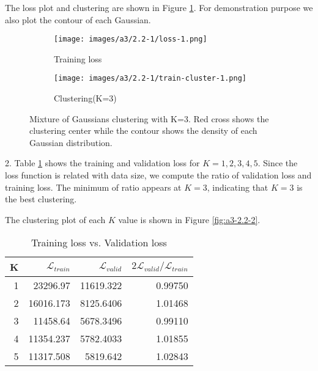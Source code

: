 \documentclass[12pt]{article}
\begin{document}
The loss plot and clustering are shown in Figure \ref{fig:a3-2.2-1}.
For demonstration purpose we also plot the contour of each Gaussian.

\begin{figure}[!htb]
\centering
\begin{subfigure}{.5\textwidth}
  \centering
  \texttt{[image: images/a3/2.2-1/loss-1.png]}
  \caption{Training loss}
\end{subfigure}%
\begin{subfigure}{.5\textwidth}
  \centering
  \texttt{[image: images/a3/2.2-1/train-cluster-1.png]}
  \caption{Clustering(K=3)}
\end{subfigure}
\caption{Mixture of Gaussians clustering with K=3. Red cross shows the clustering center while the contour shows the density of each Gaussian distribution.}
\label{fig:a3-2.2-1}
\end{figure}

\bigskip

2. Table \ref{table:a3-2.2-2} shows the training and validation loss for $K=1,2,3,4,5$. Since the loss function is related with data size, we compute the ratio of validation loss and training loss. The minimum of ratio appears at $K = 3$, indicating that $K=3$ is the best clustering.

The clustering plot of each $K$ value is shown in Figure \ref{fig:a3-2.2-2}.

\begin{table}[!htb]
\centering
\begin{tabular}{r|r|r|r}
\hline
 K & $\mathcal{L}_{train}$ & $\mathcal{L}_{valid}$ & $2 \mathcal{L}_{valid} / \mathcal{L}_{train}$ \\ \hline
1 & 23296.97 & 11619.322 & 0.99750 \\
2 & 16016.173 & 8125.6406 & 1.01468 \\
3 & 11458.64 & 5678.3496 & 0.99110 \\
4 & 11354.237 & 5782.4033 & 1.01855 \\
5 & 11317.508 & 5819.642 & 1.02843 \\
\hline
\end{tabular}
\caption{Training loss vs. Validation loss}
\label{table:a3-2.2-2}
\end{table}
\end{document}
